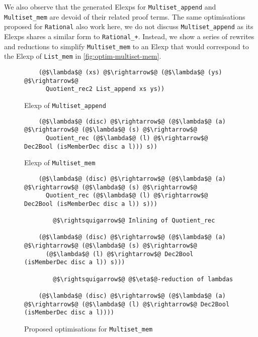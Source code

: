 \documentclass[12pt,twoside,maitrise]{dms}
\theoremstyle{definition}
\numberwithin{equation}{section}
\numberwithin{table}{chapter}
\numberwithin{figure}{chapter}
\newcommand\id[1] {\texttt{#1}}
\begin{document}
We also observe that the generated Elexps for \id{Multiset\_append} and
\id{Multiset\_mem} are devoid of their related proof terms. The same
optimisations proposed for \id{Rational} also work here, we do not discuss
\id{Multiset\_append} as its Elexps shares a similar form to \id{Rational\_+}.
Instead, we show a series of rewrites and reductions to simplify
\id{Multiset\_mem} to an Elexp that would correspond to the Elexp of
\id{List\_mem} in \autoref{fig:optim-multiset-mem}.

\begin{figure}
\begin{verbatim}
    (@$\lambda$@ (xs) @$\rightarrow$@ (@$\lambda$@ (ys) @$\rightarrow$@
      Quotient_rec2 List_append xs ys))
\end{verbatim}
\caption{Elexp of \id{Multiset\_append}}
\end{figure}

\begin{figure}
\begin{verbatim}
    (@$\lambda$@ (disc) @$\rightarrow$@ (@$\lambda$@ (a) @$\rightarrow$@ (@$\lambda$@ (s) @$\rightarrow$@
      Quotient_rec (@$\lambda$@ (l) @$\rightarrow$@ Dec2Bool (isMemberDec disc a l))) s))
\end{verbatim}
\caption{Elexp of \id{Multiset\_mem}}
\end{figure}

\begin{figure}
\begin{mdframed}
\begin{verbatim}
    (@$\lambda$@ (disc) @$\rightarrow$@ (@$\lambda$@ (a) @$\rightarrow$@ (@$\lambda$@ (s) @$\rightarrow$@
      Quotient_rec (@$\lambda$@ (l) @$\rightarrow$@ Dec2Bool (isMemberDec disc a l)) s)))

        @$\rightsquigarrow$@ Inlining of Quotient_rec

    (@$\lambda$@ (disc) @$\rightarrow$@ (@$\lambda$@ (a) @$\rightarrow$@ (@$\lambda$@ (s) @$\rightarrow$@
      (@$\lambda$@ (l) @$\rightarrow$@ Dec2Bool (isMemberDec disc a l)) s)))

        @$\rightsquigarrow$@ @$\eta$@-reduction of lambdas

    (@$\lambda$@ (disc) @$\rightarrow$@ (@$\lambda$@ (a) @$\rightarrow$@ (@$\lambda$@ (l) @$\rightarrow$@ Dec2Bool (isMemberDec disc a l))))
\end{verbatim}
\end{mdframed}
\caption{Proposed optimisations for \id{Multiset\_mem}}\label{fig:optim-multiset-mem}
\end{figure}
\end{document}
